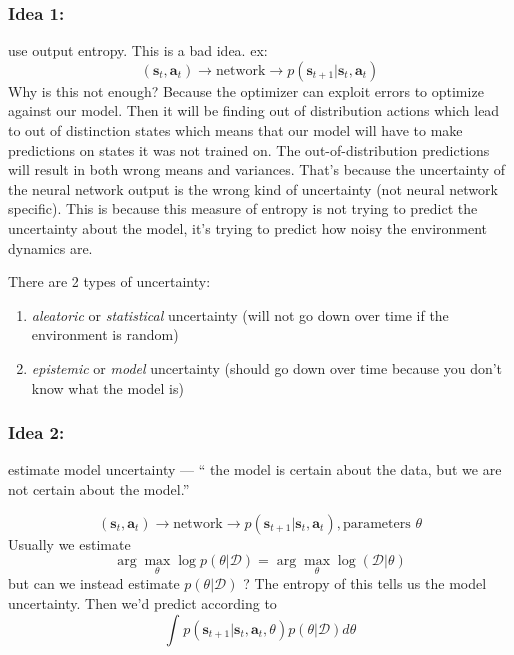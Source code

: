 \documentclass{report}
\newcommand{\argmax}{\arg\!\max}
\begin{document}
\subsubsection{Idea 1:} use output entropy. This is a bad idea.
ex:
\begin{equation}
		(\bm{s}_{t}, \bm{a}_{t} ) \to \text{network} \to p( \bm{s}_{t+1}| \bm{s}_{t}, \bm{a}_{t})
\end{equation}
Why is this not enough? Because the optimizer can exploit errors to optimize against our model.
Then it will be finding out of distribution actions which lead to out of distinction states which means
that our model will have to make predictions on states it was not trained on.
The out-of-distribution predictions will result in both wrong means and variances.
That's because the uncertainty of the neural network output is the wrong kind of uncertainty (not neural network specific).
This is because this measure of entropy is not trying to predict the uncertainty about the model,
it's trying to predict how noisy the environment dynamics are.

There are 2 types of uncertainty:
\begin{enumerate}
		\item \textit{aleatoric} or \textit{statistical} uncertainty (will not go down over time if the environment is random)
		\item \textit{epistemic} or \textit{model} uncertainty (should go down over time because you don't know what the model is)
\end{enumerate}

\subsubsection{Idea 2:} estimate model uncertainty --- `` the model is certain about the data, but we are not certain about the model.''

\begin{equation}
		(\bm{s}_{t}, \bm{a}_{t} ) \to \text{network} \to p( \bm{s}_{t+1}| \bm{s}_{t}, \bm{a}_{t}), \text{parameters } \theta
\end{equation}
Usually we estimate
\begin{equation}
\argmax_\theta \log p(\theta | \mathcal{D}) = \argmax_\theta \log (\mathcal{D}| \theta)
\end{equation}
but can we instead estimate $p(\theta|\mathcal{D})$ ? The entropy of this tells us the model uncertainty.
Then we'd predict according to 
\begin{equation}
		\int_{}^{} p(\bm{s}_{t+1}| \bm{s}_{t}, \bm{a}_{t}, \theta) p(\theta|\mathcal{D}) d\theta
\end{equation}
\end{document}

